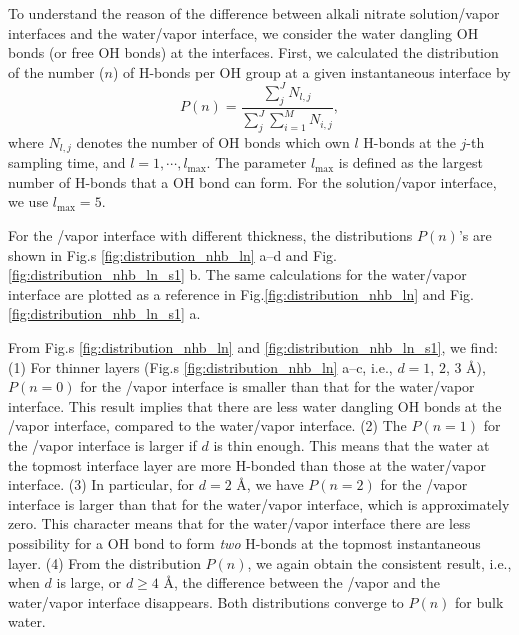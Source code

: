 To understand the reason of the difference between alkali nitrate solution/vapor interfaces and the water/vapor interface,
we consider the water dangling OH bonds (or free OH bonds) at the interfaces. 
First, we calculated the distribution of the number ($n$) of H-bonds per OH group at a given instantaneous interface by
\begin{equation}
P(n) = \frac{\sum_j^J N_{l,j}}{\sum_{j}^J \sum_{i=1}^M N_{i,j}},
\label{eq:Pn_distribution}
\end{equation}
where $N_{l,j}$ denotes the number of OH bonds which own $l$ H-bonds at the $j$-th sampling time, 
and $l=1,\cdots,l_\text{max}$. The parameter $l_\text{max}$ is defined as the largest number of H-bonds that a OH bond can form.
For the solution/vapor interface, we use $l_\text{max}=5$.

For the \LiN/vapor interface with different thickness, the distributions $P(n)$'s are shown in Fig.s \ref{fig:distribution_nhb_ln} a--d 
and Fig.\thinspace\ref{fig:distribution_nhb_ln_s1} b. The same calculations for the water/vapor interface are plotted as a reference in Fig.\thinspace\ref{fig:distribution_nhb_ln} 
and Fig.\thinspace\ref{fig:distribution_nhb_ln_s1} a.

From Fig.s \ref{fig:distribution_nhb_ln} and \ref{fig:distribution_nhb_ln_s1}, we find:
(1) For thinner layers (Fig.s \ref{fig:distribution_nhb_ln} a--c, i.e., $d=1$, $2$, $3$ \AA), 
$P(n=0)$ for the \LiN/vapor interface is smaller than that for the water/vapor interface.
This result implies that there are less water dangling OH bonds at the \LiN/vapor interface, 
compared to the water/vapor interface.
(2) The $P(n=1)$ for the \LiN/vapor interface is larger if $d$ is thin enough. This means that the water at the topmost interface layer are more H-bonded than those at the 
water/vapor interface.
(3) In particular, for $d=2$ \AA, we have $P(n=2)$ for the \LiN/vapor interface is larger than that for the water/vapor interface, which is approximately zero.
This character means that for the water/vapor interface there are less possibility for a OH bond to form \emph{two} H-bonds at the topmost instantaneous layer. 
(4) From the distribution $P(n)$, we again obtain the consistent result, i.e., when $d$ is large, or $d \ge 4$ \AA, 
the difference between the \LiN/vapor and the water/vapor interface disappears.
Both distributions converge to $P(n)$ for bulk water.

